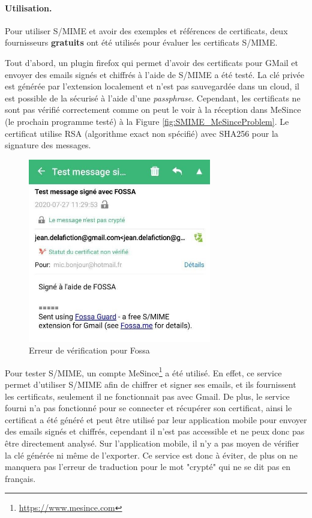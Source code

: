 \paragraph*{Utilisation.}
Pour utiliser S/MIME et avoir des exemples et références de certificats, deux fournisseurs \textbf{gratuits} ont été utilisés pour évaluer les certificats S/MIME.

Tout d'abord, un plugin firefox qui permet d'avoir des certificats pour GMail et envoyer des emails signés et chiffrés à l'aide de S/MIME a été testé. La clé privée est générée par l'extension localement et n'est pas sauvegardée dans un cloud, il est possible de la sécurisé à l'aide d'une \textit{passphrase}. Cependant, les certificats ne sont pas vérifié correctement comme on peut le voir à la réception dans MeSince (le prochain programme testé) à la Figure \ref{fig:SMIME_MeSinceProblem}. Le certificat utilise RSA (algorithme exact non spécifié) avec SHA256 pour la signature des messages.
\begin{figure}[h!]
	\includegraphics[width=8cm]{images/SMIME_FossaProblem.jpg}
	\centering
	\caption{Erreur de vérification pour Fossa}
	\label{fig:SMIME_FossaProblem}
\end{figure}

Pour tester S/MIME, un compte MeSince\footnote{\url{https://www.mesince.com}} a été utilisé. En effet, ce service permet d'utiliser S/MIME afin de chiffrer et signer ses emails, et ils fournissent les certificats, seulement il ne fonctionnait pas avec Gmail. De plus, le service fourni n'a pas fonctionné pour se connecter et récupérer son certificat, ainsi le certificat a été généré et peut être utilisé par leur application mobile pour envoyer des emails signés et chiffrés, cependant il n'est pas accessible et ne peux donc pas être directement analysé. Sur l'application mobile, il n'y a pas moyen de vérifier la clé générée ni même de l'exporter. Ce service est donc à éviter, de plus on ne manquera pas l'erreur de traduction pour le mot "crypté" qui ne se dit pas en français.

